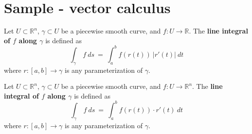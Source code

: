 \documentclass[11pt,openany]{book}
\newcommand{\definition}[2]{\begin{tcolorbox}[title=Definition ({#1}),colframe=black]{#2}\end{tcolorbox}
}
\begin{document}
	
	\chapter{Sample - vector calculus}
	
	\definition{Line Integral - scalar}{
		Let $U \subset \mathbb{R}^n$, $\gamma \subset U$ be a piecewise smooth curve, and $f: U \to \mathbb{R}$. The \textbf{line integral of $f$ along $\gamma$} is defined as
		\[
		\int_\gamma \ f \ ds \ = \ \int_a^b f(r(t)) \ |r'(t)| \ dt
		\]
		where $r : [a,b] \to \gamma$ is any parameterization of $\gamma$.
	}
	\definition{Line Integral - vector}{
		Let $U \subset \mathbb{R}^n$, $\gamma \subset U$ be a piecewise smooth curve, and $f: U \to \mathbb{R}^n$. The \textbf{line integral of $f$ along $\gamma$} is defined as
		\[
		\int_\gamma \ f \ ds \ = \ \int_a^b f(r(t)) \cdot r'(t)  \ dt
		\]
		where $r : [a,b] \to \gamma$ is any parameterization of $\gamma$.
	}
\end{document}
